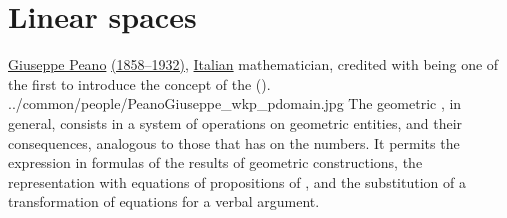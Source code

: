 




\chapter{Linear spaces}
\qboxnpq
  {\href{http://en.wikipedia.org/wiki/Giuseppe_Peano}{Giuseppe Peano}
   \href{http://www-history.mcs.st-andrews.ac.uk/Timelines/TimelineF.html}{(1858--1932)},
   \href{http://www-history.mcs.st-andrews.ac.uk/BirthplaceMaps/Places/Italy.html}{Italian} mathematician,
   credited with being one of the first to introduce the concept of the  ().\footnotemark}
  {../common/people/PeanoGiuseppe_wkp_pdomain.jpg}
  {The geometric , in general, 
   consists in a system of operations on geometric entities, and their consequences, 
   analogous to those that  has on the numbers.
   It permits the expression in formulas of the results of geometric constructions,
   the representation with equations of propositions of ,
   and the substitution of a transformation of equations for a verbal argument.}



